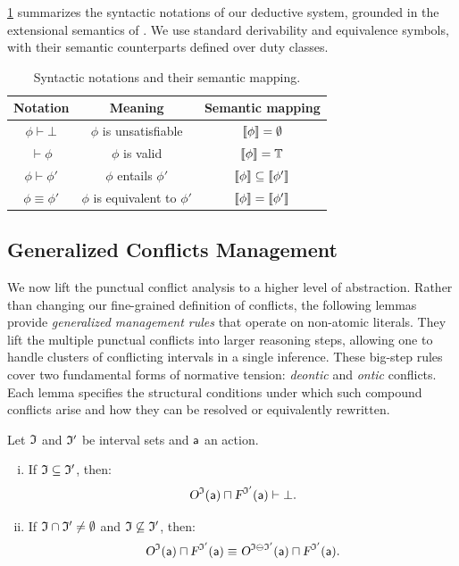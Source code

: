 \medskip

\noindent
\ref{syncnotation} summarizes the syntactic notations of our deductive system, grounded in the extensional semantics of \TDDLfm.  
We use standard derivability and equivalence symbols, with their semantic counterparts defined over duty classes.

\begin{table}[h]
\centering
\renewcommand{\arraystretch}{1.3}
\begin{tabular}{|c|c|c|}
\hline
\textbf{Notation} & \textbf{Meaning} & \textbf{Semantic mapping} \\ \hline
$\phi \vdash \bot$ & $\phi$ is unsatisfiable & $\llbracket \phi \rrbracket = \emptyset$ \\ \hline
$\vdash \phi$ & $\phi$ is valid & $\llbracket \phi \rrbracket = \mathbb{T}$ \\ \hline
$\phi \vdash \phi'$ & $\phi$ entails $\phi'$ & $\llbracket \phi \rrbracket \subseteq \llbracket \phi' \rrbracket$ \\ \hline
$\phi \equiv \phi'$ & $\phi$ is equivalent to $\phi'$ & $\llbracket \phi \rrbracket = \llbracket \phi' \rrbracket$ \\ \hline
\end{tabular}
\caption{Syntactic notations and their semantic mapping.}
\label{syncnotation}
\end{table}

\subsection{Generalized Conflicts Management}

We now lift the punctual conflict analysis to a higher level of abstraction.  
Rather than changing our fine-grained definition of conflicts, the following lemmas provide \emph{generalized management rules} that operate on non-atomic literals.  
They lift the multiple punctual conflicts into larger reasoning steps, allowing one to handle clusters of conflicting intervals in a single inference.  
These big-step rules cover two fundamental forms of normative tension: \emph{deontic} and \emph{ontic} conflicts.  
Each lemma specifies the structural conditions under which such compound conflicts arise and how they can be resolved or equivalently rewritten.


\begin{lemma}\label{Gdeontic-conflict}
Let $\mathfrak{I}$ and $\mathfrak{I}'$ be interval sets and $\mathsf{a} $ an action.
\begin{enumerate}[(i)]
\item If $\mathfrak{I} \subseteq \mathfrak{I}'$, then:
\[
\textsl{O}^{\mathfrak{I}}(\mathsf{a}) \sqcap \textsl{F}^{\mathfrak{I}'}(\mathsf{a}) \vdash \bot.
\]
\item If $\mathfrak{I} \cap \mathfrak{I}' \neq \emptyset$ and $\mathfrak{I} \not\subseteq \mathfrak{I}'$, then:
\[
\textsl{O}^{\mathfrak{I}}(\mathsf{a}) \sqcap \textsl{F}^{\mathfrak{I}'}(\mathsf{a}) 
\equiv  
\textsl{O}^{\mathfrak{I} \ominus \mathfrak{I}'}(\mathsf{a}) \sqcap \textsl{F}^{\mathfrak{I}'}(\mathsf{a}).
\]
\end{enumerate}
\end{lemma}


